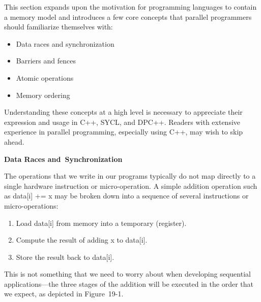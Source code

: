 This section expands upon the motivation for programming languages to contain a memory model and introduces a few core concepts that parallel programmers should familiarize themselves with:\par

\begin{itemize}
	\item Data races and synchronization
	\item Barriers and fences
	\item Atomic operations
	\item Memory ordering
\end{itemize}

Understanding these concepts at a high level is necessary to appreciate their expression and usage in C++, SYCL, and DPC++. Readers with extensive experience in parallel programming, especially using C++, may wish to skip ahead.\par

\hspace*{\fill} \par %
\textbf{Data Races and Synchronization}

The operations that we write in our programs typically do not map directly to a single hardware instruction or micro-operation. A simple addition operation such as data[i] += x may be broken down into a sequence of several instructions or micro-operations:\par

\begin{enumerate}
	\item Load data[i] from memory into a temporary 	(register).
	\item Compute the result of adding x to data[i].
	\item Store the result back to data[i].
\end{enumerate}

This is not something that we need to worry about when developing sequential applications—the three stages of the addition will be executed in the order that we expect, as depicted in Figure 19-1.\par

